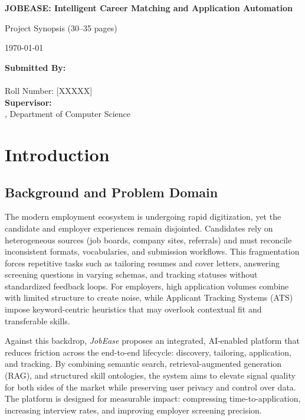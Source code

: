 \documentclass[12pt,a4paper]{report}
\begin{document}
\begin{titlepage}
  \centering
  \vspace*{2cm}
  {\LARGE\bfseries JOBEASE: Intelligent Career Matching and Application Automation\par}
  \vspace{1cm}
  {\Large Project Synopsis (30--35 pages)\par}
  \vspace{1.5cm}
  {\large \today\par}
  \vfill
  {\large 
  \textbf{Submitted By:}\\
  [Your Name Here]\\
  Roll Number: [XXXXX]\\[1cm]
  \textbf{Supervisor:}\\
  [Supervisor Name], Department of Computer Science\\
  [Institute/University]
  }
\end{titlepage}

\newpage
\tableofcontents
\newpage
\listoffigures
\newpage
\listoftables
\newpage

\chapter{Introduction}
\section{Background and Problem Domain}
The modern employment ecosystem is undergoing rapid digitization, yet the candidate and employer experiences remain disjointed. Candidates rely on heterogeneous sources (job boards, company sites, referrals) and must reconcile inconsistent formats, vocabularies, and submission workflows. This fragmentation forces repetitive tasks such as tailoring resumes and cover letters, answering screening questions in varying schemas, and tracking statuses without standardized feedback loops. For employers, high application volumes combine with limited structure to create noise, while Applicant Tracking Systems (ATS) impose keyword-centric heuristics that may overlook contextual fit and transferable skills.

Against this backdrop, \textit{JobEase} proposes an integrated, AI-enabled platform that reduces friction across the end-to-end lifecycle: discovery, tailoring, application, and tracking. By combining semantic search, retrieval-augmented generation (RAG), and structured skill ontologies, the system aims to elevate signal quality for both sides of the market while preserving user privacy and control over data. The platform is designed for measurable impact: compressing time-to-application, increasing interview rates, and improving employer screening precision.
\end{document}

